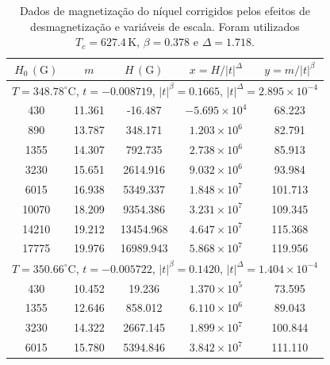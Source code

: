 \documentclass[11pt,a4paper]{article}
\begin{document}
\begin{table}[H]
\centering
\small
\caption{
Dados de magnetização do níquel corrigidos pelos efeitos de
desmagnetização e variáveis de escala. Foram utilizados
$T_c=627.4\,\mathrm K$, $\beta=0.378$ e $\Delta=1.718$.
}
\label{tab:dados_Ni}
\begin{tabular}{@{}ccccc@{}}
\toprule
$H_0\,(\mathrm G)$
&
$m$
&
$H\,(\mathrm G)$
&
$x=H/|t|^\Delta$
&
$y=m/|t|^\beta$
\\
\midrule

\multicolumn{5}{c}{
$T=348.78^\circ\mathrm C$,
$t=-0.008719$,
$|t|^\beta=0.1665$,
$|t|^\Delta=2.895\times10^{-4}$
}
\\

430
& 11.361
& -16.487
& $-5.695\times10^4$
& 68.223
\\

890
& 13.787
& 348.171
& $1.203\times10^6$
& 82.791
\\

1355
& 14.307
& 792.735
& $2.738\times10^6$
& 85.913
\\

3230
& 15.651
& 2614.916
& $9.032\times10^6$
& 93.984
\\

6015
& 16.938
& 5349.337
& $1.848\times10^7$
& 101.713
\\

10070
& 18.209
& 9354.386
& $3.231\times10^7$
& 109.345
\\

14210
& 19.212
& 13454.968
& $4.647\times10^7$
& 115.368
\\

17775
& 19.976
& 16989.943
& $5.868\times10^7$
& 119.956
\\

\midrule

\multicolumn{5}{c}{
$T=350.66^\circ\mathrm C$,
$t=-0.005722$,
$|t|^\beta=0.1420$,
$|t|^\Delta=1.404\times10^{-4}$
}
\\

430
& 10.452
& 19.236
& $1.370\times10^5$
& 73.595
\\

1355
& 12.646
& 858.012
& $6.110\times10^6$
& 89.043
\\

3230
& 14.322
& 2667.145
& $1.899\times10^7$
& 100.844
\\

6015
& 15.780
& 5394.846
& $3.842\times10^7$
& 111.110
\\


\end{tabular}
\end{table}
\end{document}
